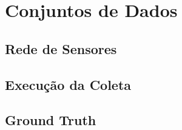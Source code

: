 \chapter{Conjuntos de Dados}
\label{cap:conjuntos_de_dados}

\section{Rede de Sensores}

\section{Execução da Coleta}

\section{Ground Truth}